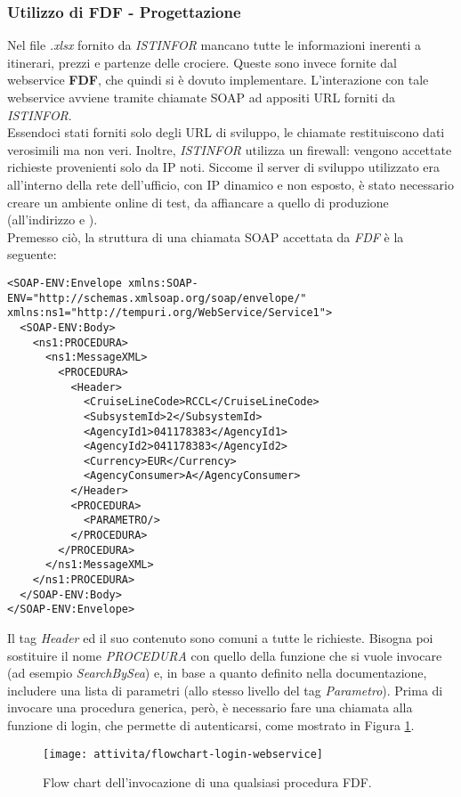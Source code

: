 \subsubsection{Utilizzo di FDF - Progettazione}
Nel file \textit{.xlsx} fornito da \textit{ISTINFOR} mancano tutte le informazioni inerenti a itinerari, prezzi e partenze delle crociere. Queste sono invece fornite dal \gls{webservice} \textbf{FDF}, che quindi si è dovuto implementare. L'interazione con tale \gls{webservice} avviene tramite chiamate \gls{SOAP} ad appositi URL forniti da \textit{ISTINFOR}.\\ Essendoci stati forniti solo degli URL di sviluppo, le chiamate restituiscono dati verosimili ma non veri. Inoltre, \textit{ISTINFOR} utilizza un firewall: vengono accettate richieste provenienti solo da IP noti. Siccome il server di sviluppo utilizzato era all'interno della rete dell'ufficio, con IP dinamico e non esposto, è stato necessario creare un ambiente online di test, da affiancare a quello di produzione (all'indirizzo \cite{site:sviluppo-crociereregalo} e \cite{site:sviluppo-dataexchange}).\\
Premesso ciò, la struttura di una chiamata \gls{SOAP} accettata da \textit{FDF} è la seguente:
\begin{lstlisting}
<SOAP-ENV:Envelope xmlns:SOAP-ENV="http://schemas.xmlsoap.org/soap/envelope/" xmlns:ns1="http://tempuri.org/WebService/Service1">
  <SOAP-ENV:Body>
    <ns1:PROCEDURA>
      <ns1:MessageXML>
        <PROCEDURA>
          <Header>
            <CruiseLineCode>RCCL</CruiseLineCode>
            <SubsystemId>2</SubsystemId>
            <AgencyId1>041178383</AgencyId1>
            <AgencyId2>041178383</AgencyId2>
            <Currency>EUR</Currency>
            <AgencyConsumer>A</AgencyConsumer>
          </Header>
          <PROCEDURA>
            <PARAMETRO/>
          </PROCEDURA>
        </PROCEDURA>
      </ns1:MessageXML>
    </ns1:PROCEDURA>
  </SOAP-ENV:Body>
</SOAP-ENV:Envelope>
\end{lstlisting} 
Il tag \textit{Header} ed il suo contenuto sono comuni a tutte le richieste. Bisogna poi sostituire il nome \textit{PROCEDURA} con quello della funzione che si vuole invocare (ad esempio \textit{SearchBySea}) e, in base a quanto definito nella documentazione, includere una lista di parametri (allo stesso livello del tag \textit{Parametro}). Prima di invocare una procedura generica, però, è necessario fare una chiamata alla funzione di login, che permette di autenticarsi, come mostrato in Figura \ref{figura:flowchart-login-webservice}.
\begin{figure}[!h] 
	\centering 
	\texttt{[image: attivita/flowchart-login-webservice]} 
	\caption{Flow chart dell'invocazione di una qualsiasi procedura FDF.}
	\label{figura:flowchart-login-webservice}
\end{figure}\\
